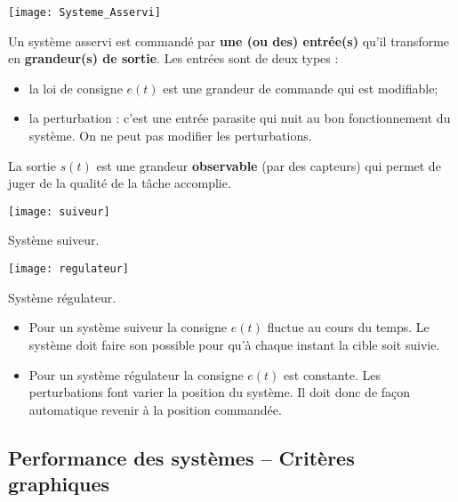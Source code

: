 \begin{marginfigure}[1cm]
\texttt{[image: Systeme\_Asservi]}
\end{marginfigure}


\begin{defi}

Un système asservi est commandé par \textbf{une (ou des) entrée(s)} qu'il
transforme en \textbf{grandeur(s) de sortie}.
Les entrées sont de deux types : 
\begin{itemize}
\item la loi de consigne $e(t)$ est une grandeur de commande qui est modifiable;
\item la perturbation : c'est une entrée parasite qui nuit au bon
fonctionnement du système. On ne peut pas modifier les perturbations.
\end{itemize}

La sortie $s(t)$ est une grandeur \textbf{observable} (par des capteurs) qui
permet de juger de la qualité de la tâche accomplie.
\end{defi} 

\vspace{.1cm}

\begin{marginfigure}
\texttt{[image: suiveur]}
\caption{Système suiveur.}
\end{marginfigure}

\begin{marginfigure}
\texttt{[image: regulateur]}
\caption{Système régulateur.}
\end{marginfigure}

\begin{defi}
\begin{itemize}
\item Pour un système suiveur la consigne $e(t)$ fluctue au cours du temps. Le système doit faire son possible pour qu'à chaque instant la cible soit suivie.
\item Pour un système régulateur la consigne $e(t)$ est constante. Les perturbations font varier la position du système. Il doit donc de façon automatique revenir à la position commandée.
\end{itemize}
\end{defi}

\vspace{.1cm}

\subsection{Performance des systèmes -- Critères graphiques}

